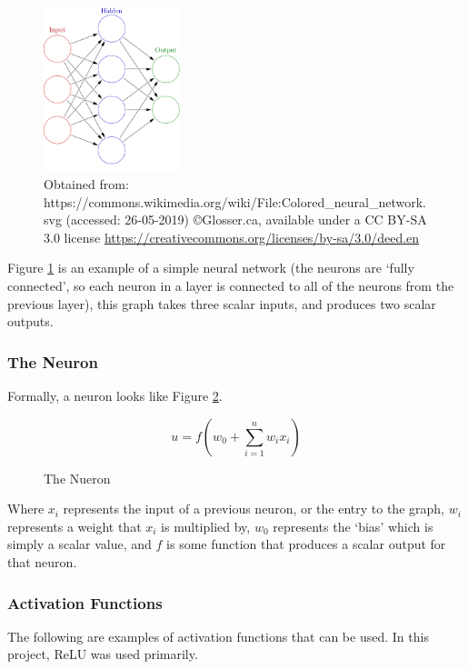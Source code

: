     \begin{figure}[h]
        \centering
        \includegraphics[width=150px]{../img/1000px-Colored_neural_network.png}
        \caption{Obtained from: https://commons.wikimedia.org/wiki/File:Colored\_neural\_network.svg (accessed: 26-05-2019) \copyright \space Glosser.ca, available under a CC BY-SA 3.0 license \url{https://creativecommons.org/licenses/by-sa/3.0/deed.en}}
        \label{fig:fcneuralnet}
    \end{figure}

    Figure \ref{fig:fcneuralnet} is an example of a simple neural network (the neurons are `fully connected', so each neuron in a layer is connected to all of the neurons from the previous layer), this graph takes three scalar inputs, and produces two scalar outputs.

        \subsubsection{The Neuron}
        Formally, a neuron looks like Figure \ref{fig:theneuron}.
        \begin{figure}[h]
        \[
            u=f(w_0+\sum_{i=1}^nw_ix_i)
        \]
        \caption{The Nueron}
        \label{fig:theneuron}
        \end{figure}
        Where $x_i$ represents the input of a previous neuron, or the entry to the graph, $w_i$ represents a weight that $x_i$ is multiplied by, $w_0$ represents the `bias' which is simply a scalar value, and $f$ is some function that produces a scalar output for that neuron.
        
        \subsubsection{Activation Functions}
        The following are examples of activation functions that can be used. In this project, ReLU was used primarily.\\

